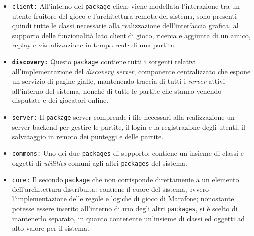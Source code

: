    \begin{itemize}
    \item{\texttt{client:}} All'interno del \texttt{package} client viene modellata l'interazione tra un utente fruitore del gioco e
    l'architettura remota del sistema, sono presenti quindi tutte le classi necessarie alla realizzazione dell'interfaccia grafica, al supporto delle funzionalità lato client di gioco, ricerca e aggiunta di un amico, replay e visualizzazione in tempo reale di una partita.


    \item{\textbf{\texttt{discovery:}}}
      Questo \texttt{package} contiene tutti i sorgenti relativi all'implementazione del \textit{discovery server},
      componente centralizzato che espone un servizio di pagine gialle, mantenendo traccia di tutti i \textit{server} attivi
      all'interno del sistema, nonché di tutte le partite che stanno venendo disputate e dei giocatori online.

    \item{\texttt{server:}}
      Il \texttt{package} server comprende i file necessari alla realizzazione un server backend per gestire le partite,
      il login e la registrazione degli utenti, il salvataggio in remoto dei punteggi e delle partite.

    \item{\texttt{commons:}}
      Uno dei due \texttt{packages} di supporto: contiene un insieme di classi e oggetti di \textit{utilities} comuni agli altri \texttt{packages} del sistema.

    \item{\texttt{core:}}
      Il secondo \texttt{package} che non corrisponde direttamente a un elemento dell'architettura distribuita: contiene il cuore del sistema, ovvero l'implementazione delle regole e logiche di gioco di Marafone; nonostante potesse essere inserito all'interno di uno degli altri \texttt{packages}, si è scelto di mantenerlo separato, in quanto contenente un'insieme di classi ed oggetti ad alto valore per il sistema.

  \end{itemize}

